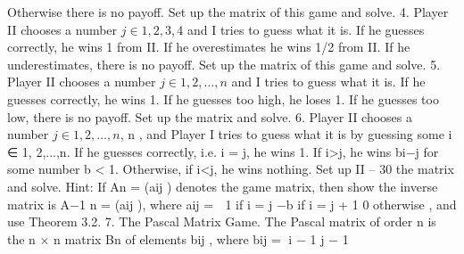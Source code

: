 \documentclass[]{report}
\begin{document}
Otherwise there is no payoff. Set up the matrix of this game and solve.
4. Player II chooses a number $j \in {1, 2, 3, 4}$ and I tries to guess what it is. If
he guesses correctly, he wins 1 from II. If he overestimates he wins 1/2 from II. If he
underestimates, there is no payoff. Set up the matrix of this game and solve.
5. Player II chooses a number $j \in {1, 2,\ldots,n}$ and I tries to guess what it is. If he
guesses correctly, he wins 1. If he guesses too high, he loses 1. If he guesses too low, there
is no payoff. Set up the matrix and solve.
6. Player II chooses a number $j \in {1, 2,\ldots,n}$, n , and Player I tries to guess
what it is by guessing some i ∈ {1, 2,...,n}. If he guesses correctly, i.e. i = j, he wins 1.
If i>j, he wins bi−j for some number b < 1. Otherwise, if i<j, he wins nothing. Set up
II – 30
the matrix and solve. Hint: If An = (aij ) denotes the game matrix, then show the inverse
matrix is A−1
n = (aij ), where aij =
 1 if i = j
−b if i = j + 1
0 otherwise
, and use Theorem 3.2.
7. The Pascal Matrix Game. The Pascal matrix of order n is the n × n matrix
Bn of elements bij , where
bij =
i − 1
j − 1
\end{document}
